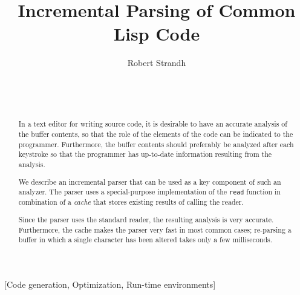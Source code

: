 \documentclass{acm_proc_article-sp}
\def\inputtex#1{}
\begin{document}
\title{Incremental Parsing of Common Lisp Code}
\author{\alignauthor
Robert Strandh\\
\\
\\
\\
}


\maketitle

\begin{abstract}
In a text editor for writing \commonlisp{} \cite{ansi:common:lisp}
source code, it is desirable to have an accurate analysis of the
buffer contents, so that the role of the elements of the code can be
indicated to the programmer.  Furthermore, the buffer contents should
preferably be analyzed after each keystroke so that the programmer has
up-to-date information resulting from the analysis.

We describe an incremental parser that can be used as a key component
of such an analyzer.  The parser uses a special-purpose implementation
of the \commonlisp{} \texttt{read} function in combination of a
\emph{cache} that stores existing results of calling the reader.

Since the parser uses the standard \commonlisp{} reader, the resulting
analysis is very accurate.  Furthermore, the cache makes the parser
very fast in most common cases; re-parsing a buffer in which a single
character has been altered takes only a few milliseconds.
\end{abstract}

[Code generation, Optimization, Run-time environments]


\keywords{\commonlisp{}}

\inputtex{sec-introduction.tex}
\inputtex{sec-previous.tex}
\inputtex{sec-our-method.tex}
\inputtex{sec-performance.tex}
\inputtex{sec-conclusions.tex}
\inputtex{sec-acknowledgements.tex}



\end{document}
